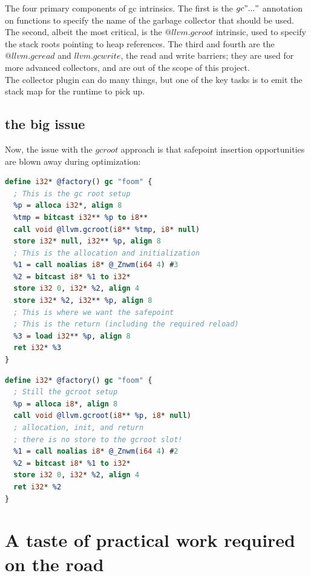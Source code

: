 \documentclass{article}
\begin{document}
The four primary components of gc intrinsics. The first is the
$gc "..."$ annotation on functions to specify the name of the garbage
collector that should be used. The second, albeit the most critical,
is the $@llvm.gcroot$ intrinsic, used to specify the stack roots
pointing to heap references. The third and fourth are the
$@llvm.gcread$ and $llvm.gcwrite$, the read and write barriers; they
are used for more advanced collectors, and are out of the scope of
this project.\\

The collector plugin can do many things, but one of the key tasks is
to emit the stack map for the runtime to pick up.

\subsection{the big issue}
Now, the issue with the $gcroot$ approach is that safepoint insertion
opportunities are blown away during optimization:

\begin{lstlisting}[language=llvm]
define i32* @factory() gc "foom" {
  ; This is the gc root setup
  %p = alloca i32*, align 8
  %tmp = bitcast i32** %p to i8**
  call void @llvm.gcroot(i8** %tmp, i8* null)
  store i32* null, i32** %p, align 8
  ; This is the allocation and initialization
  %1 = call noalias i8* @_Znwm(i64 4) #3
  %2 = bitcast i8* %1 to i32*
  store i32 0, i32* %2, align 4
  store i32* %2, i32** %p, align 8
  ; This is where we want the safepoint
  ; This is the return (including the required reload)
  %3 = load i32** %p, align 8
  ret i32* %3
}
\end{lstlisting}
\begin{lstlisting}[language=llvm]
define i32* @factory() gc "foom" {
  ; Still the gcroot setup
  %p = alloca i8*, align 8
  call void @llvm.gcroot(i8** %p, i8* null)
  ; allocation, init, and return
  ; there is no store to the gcroot slot!
  %1 = call noalias i8* @_Znwm(i64 4) #2
  %2 = bitcast i8* %1 to i32*
  store i32 0, i32* %2, align 4
  ret i32* %2
}
\end{lstlisting}

\section{A taste of practical work required on the road}
\end{document}
